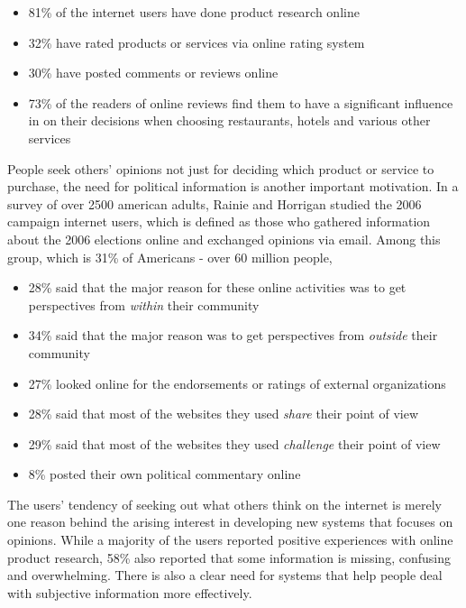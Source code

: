 \begin{itemize}
	\item 81\% of the internet users have done product research online
    \item 32\% have rated products or services via online rating system
    \item 30\% have posted comments or reviews online
    \item 73\% of the readers of online reviews find them to have a significant influence in on their decisions when choosing restaurants, hotels and various other services
\end{itemize}
	
People seek others' opinions not just for deciding which product or service to purchase, the need for political information is another important motivation. In a survey \cite{rainie2007election} of over 2500 american adults, Rainie and Horrigan studied the 2006 campaign internet users, which is defined as those who gathered information about the 2006 elections online and exchanged opinions via email.  Among this group, which is 31\% of Americans - over 60 million people,

\begin{itemize}
    \item 28\% said that the major reason for these online activities was to get perspectives from \emph{within} their community
    \item 34\% said that the major reason was to get perspectives from \emph{outside} their community
    \item 27\% looked online for the endorsements or ratings of external organizations
    \item 28\% said that most of the websites they used \emph{share} their point of view
    \item 29\% said that most of the websites they used \emph{challenge} their point of view
    \item 8\% posted their own political commentary online
\end{itemize}

The users' tendency of seeking out what others think on the internet is merely one reason behind the arising interest in developing new systems that focuses on opinions. While a majority of the users reported positive experiences with online product research, 58\% also reported that some information is missing, confusing and overwhelming. There is also a clear need for systems that help people deal with subjective information more effectively. 

